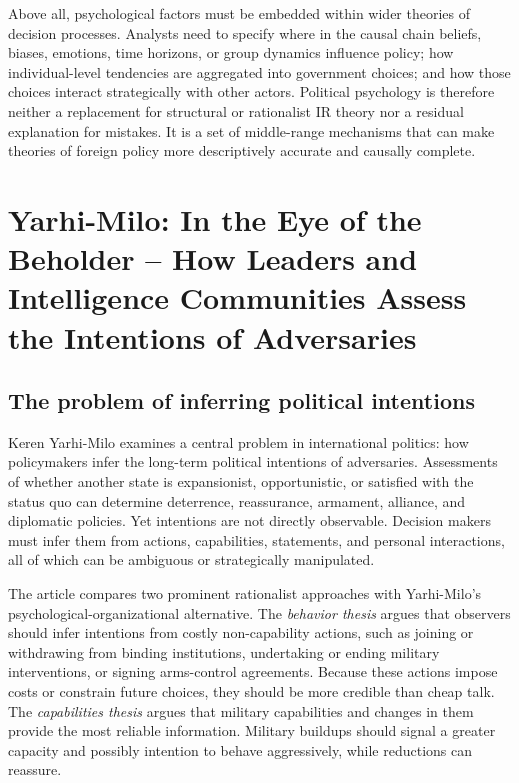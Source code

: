 Above all, psychological factors must be embedded within wider theories of decision processes. Analysts need to specify where in the causal chain beliefs, biases, emotions, time horizons, or group dynamics influence policy; how individual-level tendencies are aggregated into government choices; and how those choices interact strategically with other actors. Political psychology is therefore neither a replacement for structural or rationalist IR theory nor a residual explanation for mistakes. It is a set of middle-range mechanisms that can make theories of foreign policy more descriptively accurate and causally complete.

\clearpage
\clearpage
\section{Yarhi-Milo: In the Eye of the Beholder -- How Leaders and Intelligence Communities Assess the Intentions of Adversaries}

\subsection{The problem of inferring political intentions}

Keren Yarhi-Milo examines a central problem in international politics: how policymakers infer the long-term political intentions of adversaries. Assessments of whether another state is expansionist, opportunistic, or satisfied with the status quo can determine deterrence, reassurance, armament, alliance, and diplomatic policies. Yet intentions are not directly observable. Decision makers must infer them from actions, capabilities, statements, and personal interactions, all of which can be ambiguous or strategically manipulated.

The article compares two prominent rationalist approaches with Yarhi-Milo's psychological-organizational alternative. The \emph{behavior thesis} argues that observers should infer intentions from costly non-capability actions, such as joining or withdrawing from binding institutions, undertaking or ending military interventions, or signing arms-control agreements. Because these actions impose costs or constrain future choices, they should be more credible than cheap talk. The \emph{capabilities thesis} argues that military capabilities and changes in them provide the most reliable information. Military buildups should signal a greater capacity and possibly intention to behave aggressively, while reductions can reassure.

